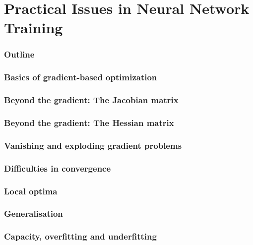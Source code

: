 \renewcommand{\thispart}{5 }
\renewcommand{\thispartname}{Practical Issues in Neural Network Training}

\part{\thispartname}

\section{Outline}




\section{Basics of gradient-based optimization}

\section{Beyond the gradient: The Jacobian matrix}

\section{Beyond the gradient: The Hessian matrix}


\section{Vanishing and exploding gradient problems}

\section{Difficulties in convergence}
\section{Local optima}

\section{Generalisation}


\section{Capacity, overfitting and underfitting}



